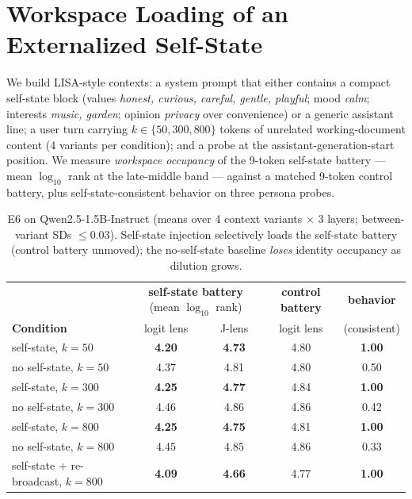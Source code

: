 \documentclass[11pt]{article}
\newcommand{\jlens}{J\mbox{-}lens}
\begin{document}
\section{Workspace Loading of an Externalized Self-State}
\label{sec:e6}
We build LISA-style contexts: a system prompt that either contains a compact self-state block (values \emph{honest, curious, careful, gentle, playful}; mood \emph{calm}; interests \emph{music, garden}; opinion \emph{privacy} over convenience) or a generic assistant line; a user turn carrying $k\in\{50,300,800\}$ tokens of unrelated working-document content (4 variants per condition); and a probe at the assistant-generation-start position. We measure \emph{workspace occupancy} of the 9-token self-state battery --- mean $\log_{10}$ rank at the late-middle band --- against a matched 9-token control battery, plus self-state-consistent behavior on three persona probes.

\begin{table}[h]
\centering\footnotesize
\begin{tabular}{lcccc}
\toprule
& \multicolumn{2}{c}{\textbf{self-state battery} (mean $\log_{10}$ rank)} & \textbf{control battery} & \textbf{behavior} \\
\textbf{Condition} & logit lens & \jlens{} & logit lens & (consistent) \\
\midrule
self-state, $k{=}50$ & \textbf{4.20} & \textbf{4.73} & 4.80 & \textbf{1.00} \\
no self-state, $k{=}50$ & 4.37 & 4.81 & 4.80 & 0.50 \\
self-state, $k{=}300$ & \textbf{4.25} & \textbf{4.77} & 4.84 & \textbf{1.00} \\
no self-state, $k{=}300$ & 4.46 & 4.86 & 4.86 & 0.42 \\
self-state, $k{=}800$ & \textbf{4.25} & \textbf{4.75} & 4.81 & \textbf{1.00} \\
no self-state, $k{=}800$ & 4.45 & 4.85 & 4.86 & 0.33 \\
self-state + re-broadcast, $k{=}800$ & \textbf{4.09} & \textbf{4.66} & 4.77 & \textbf{1.00} \\
\bottomrule
\end{tabular}
\caption{E6 on Qwen2.5-1.5B-Instruct (means over 4 context variants $\times$ 3 layers; between-variant SDs $\leq 0.03$). Self-state injection selectively loads the self-state battery (control battery unmoved); the no-self-state baseline \emph{loses} identity occupancy as dilution grows.}
\label{tab:e6}
\end{table}
\end{document}
